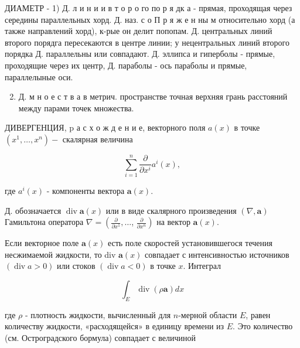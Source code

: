 \documentclass[10pt]{article}
\begin{document}
ДИАМЕТР - 1) Д. л и н и и в т о р о го по р я дк а - прямая, проходящая через середины параллельных хорд. Д. наз. с о П р я ж е н ны м относительно хорд (а также направлений хорд), к-рые он делит попопам. Д. центральных линий второго порядга пересекаются в центре линии; у нецентральных линий второго порядка Д. параллельны или совпадают. Д. эллипса и гиперболы - прямые, проходящие через их центр, Д. параболы - ось параболы и прямые, параллелыные оси.



\begin{enumerate}

  \setcounter{enumi}{1}

  \item Д. м н о е с т в а в метрич. пространстве точная верхняя грань расстояний между парами точек множества.

\end{enumerate}



ДИВЕРГЕНЦИЯ, $\mathrm{p}$ а с х о ж д е н и е, векторного поля $a(x)$ в точке $\left(x^{1}, \ldots, x^{n}\right)-$ скалярная величина



\[

\sum_{i=1}^{n} \frac{\partial}{\partial x^{i}} a^{i}(x),

\]



где $a^{i}(x)$ - компоненты вектора $\boldsymbol{a}(x)$.



Д. обозначается $\operatorname{div} \boldsymbol{a}(x)$ или в виде скалярного произведения $(\nabla, \boldsymbol{a})$ Гамильтона оператора $\nabla=\left(\frac{\partial}{\partial x^{1}}, \ldots\right.$, $\left.\frac{\partial}{\partial x^{n}}\right)$ на вектор $\boldsymbol{a}(x)$.



Если векторное поле $\boldsymbol{a}(x)$ есть поле скоростей установившегося течения несжимаемой жидкости, то div $\boldsymbol{a}(x)$ совпадает с интенсивностью источников $(\operatorname{div} a>0)$ или стоков $(\operatorname{div} a<0)$ в точке $x$. Интеграл



\[

\int_{E} \operatorname{div}(\rho \boldsymbol{a}) d x

\]



где $\rho$ - плотность жидкости, вычисленный для $n$-мерной области $E$, равен количеству жидкости, «расходящейся» в единицу времени из $E$. Это количество (см. Остроградского бормула) совпадает с величиной
\end{document}
